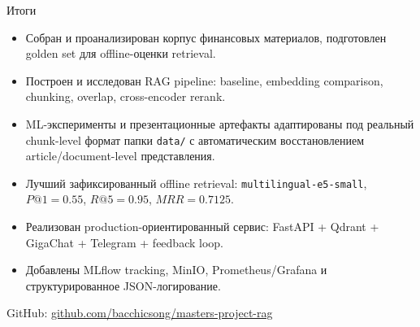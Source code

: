 \documentclass[aspectratio=169,11pt]{beamer}
\begin{document}
\begin{frame}{Итоги}
  \small
  \begin{itemize}
    \item Собран и проанализирован корпус финансовых материалов, подготовлен golden set для offline-оценки retrieval.
    \item Построен и исследован RAG pipeline: baseline, embedding comparison, chunking, overlap, cross-encoder rerank.
    \item ML-эксперименты и презентационные артефакты адаптированы под реальный chunk-level формат папки \texttt{data/} с автоматическим восстановлением article/document-level представления.
    \item Лучший зафиксированный offline retrieval: \texttt{multilingual-e5-small}, $P@1 = 0.55$, $R@5 = 0.95$, $MRR = 0.7125$.
    \item Реализован production-ориентированный сервис: FastAPI + Qdrant + GigaChat + Telegram + feedback loop.
    \item Добавлены MLflow tracking, MinIO, Prometheus/Grafana и структурированное JSON-логирование.
  \end{itemize}

  \vspace{0.5em}
  GitHub: \href{https://github.com/bacchicsong/masters-project-rag}{github.com/bacchicsong/masters-project-rag}
\end{frame}
\end{document}
